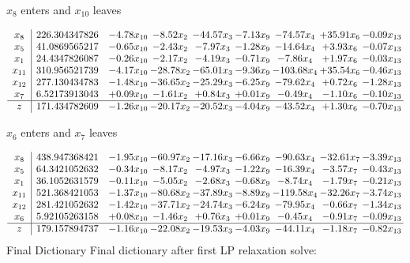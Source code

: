 \documentclass[8pt]{article}
\begin{document}
 $ x_{8} $ enters and $ x_{10} $ leaves 

 \[\begin{array}{c| c c@{\hskip 2pt} c@{\hskip 2pt} c@{\hskip 2pt} c@{\hskip 2pt} c@{\hskip 2pt} c@{\hskip 2pt} c@{\hskip 2pt} }
 x_{8}   &  226.304347826 & -4.78 x_{10} & -8.52 x_{2} & -44.57 x_{3} & -7.13 x_{9} & -74.57 x_{4} & + 35.91 x_{6} & -0.09 x_{13}\\
 x_{5}   &  41.0869565217 & -0.65 x_{10} & -2.43 x_{2} & -7.97 x_{3} & -1.28 x_{9} & -14.64 x_{4} & +  3.93 x_{6} & -0.07 x_{13}\\
 x_{1}   &  24.4347826087 & -0.26 x_{10} & -2.17 x_{2} & -4.19 x_{3} & -0.71 x_{9} & -7.86 x_{4} & +  1.97 x_{6} & -0.03 x_{13}\\
 x_{11}   &  310.956521739 & -4.17 x_{10} & -28.78 x_{2} & -65.01 x_{3} & -9.36 x_{9} & -103.68 x_{4} & + 35.54 x_{6} & -0.46 x_{13}\\
 x_{12}   &  277.130434783 & -1.48 x_{10} & -36.65 x_{2} & -25.29 x_{3} & -6.25 x_{9} & -79.62 x_{4} & +  0.72 x_{6} & -1.28 x_{13}\\
 x_{7}   &  6.52173913043 & +  0.09 x_{10} & -1.61 x_{2} & +  0.84 x_{3} & +  0.01 x_{9} & -0.49 x_{4} & -1.10 x_{6} & -0.10 x_{13}\\
\hline
z    &  171.434782609 & -1.26 x_{10} & -20.17 x_{2} & -20.52 x_{3} & -4.04 x_{9} & -43.52 x_{4} & +  1.30 x_{6} & -0.70 x_{13}\\
\end{array}\]


 $ x_{6} $ enters and $ x_{7} $ leaves 

 \[\begin{array}{c| c c@{\hskip 2pt} c@{\hskip 2pt} c@{\hskip 2pt} c@{\hskip 2pt} c@{\hskip 2pt} c@{\hskip 2pt} c@{\hskip 2pt} }
 x_{8}   &  438.947368421 & -1.95 x_{10} & -60.97 x_{2} & -17.16 x_{3} & -6.66 x_{9} & -90.63 x_{4} & -32.61 x_{7} & -3.39 x_{13}\\
 x_{5}   &  64.3421052632 & -0.34 x_{10} & -8.17 x_{2} & -4.97 x_{3} & -1.22 x_{9} & -16.39 x_{4} & -3.57 x_{7} & -0.43 x_{13}\\
 x_{1}   &  36.1052631579 & -0.11 x_{10} & -5.05 x_{2} & -2.68 x_{3} & -0.68 x_{9} & -8.74 x_{4} & -1.79 x_{7} & -0.21 x_{13}\\
 x_{11}   &  521.368421053 & -1.37 x_{10} & -80.68 x_{2} & -37.89 x_{3} & -8.89 x_{9} & -119.58 x_{4} & -32.26 x_{7} & -3.74 x_{13}\\
 x_{12}   &  281.421052632 & -1.42 x_{10} & -37.71 x_{2} & -24.74 x_{3} & -6.24 x_{9} & -79.95 x_{4} & -0.66 x_{7} & -1.34 x_{13}\\
 x_{6}   &  5.92105263158 & +  0.08 x_{10} & -1.46 x_{2} & +  0.76 x_{3} & +  0.01 x_{9} & -0.45 x_{4} & -0.91 x_{7} & -0.09 x_{13}\\
\hline
z    &  179.157894737 & -1.16 x_{10} & -22.08 x_{2} & -19.53 x_{3} & -4.03 x_{9} & -44.11 x_{4} & -1.18 x_{7} & -0.82 x_{13}\\
\end{array}\]
Final Dictionary
Final dictionary after first LP relaxation solve: 
\end{document}

